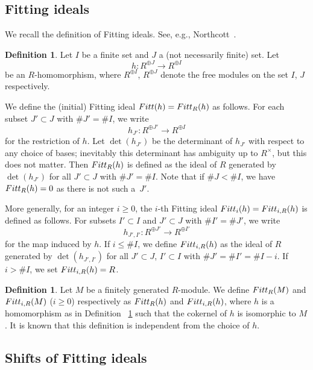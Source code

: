 \documentclass[11pt]{article}
\theoremstyle{definition}
\newtheorem{defi}[theo]{Definition}
\numberwithin{equation}{section}
\newcommand{\Fitt}{{\rm Fitt}}
\begin{document}
\subsection{Fitting ideals}\label{ss:Fitt_defn}

We recall the definition of Fitting ideals.
See, e.g., Northcott~\cite[\S 3.1]{Nor76}.

\begin{defi}\label{defn:Fitt1}
Let $I$ be a finite set and $J$ a (not necessarily finite) set.
Let
\[
h: R^{\oplus J} \to R^{\oplus I}
\]
be an $R$-homomorphism, where $R^{\oplus I}$, $R^{\oplus J}$ denote the free modules on the set $I$, $J$ respectively.

We define the (initial) Fitting ideal $\Fitt(h) = \Fitt_R(h)$ as follows.
For each subset $J' \subset J$ with $\# J' = \# I$, we write 
\[
h_{J'}: R^{\oplus J'} \to R^{\oplus I}
\]
for the restriction of $h$.
Let $\det(h_{J'})$ be the determinant of $h_{J'}$ with respect to any choice of bases; inevitably this determinant has ambiguity up to $R^{\times}$, but this does not matter.
Then $\Fitt_R(h)$ is defined as the ideal of $R$ generated by $\det(h_{J'})$ for all $J' \subset J$ with $\# J' = \# I$.
Note that if $\# J < \# I$, we have $\Fitt_R(h) = 0$ as there is not such a~$J'$.

More generally, for an integer $i \geq 0$, the $i$-th Fitting ideal $\Fitt_i(h) = \Fitt_{i, R}(h)$ is defined as follows.
For subsets $I' \subset I$ and $J' \subset J$ with $\# I' = \# J'$, we write 
\[
h_{J', I'}: R^{\oplus J'} \to R^{\oplus I'}
\]
for the map induced by $h$.
If $i \leq \# I$, we define $\Fitt_{i, R}(h)$ as the ideal of $R$ generated by $\det(h_{J', I'})$ for all $J' \subset J$, $I' \subset I$ with $\# J' = \# I' = \# I - i$.
If $i > \# I$, we set $\Fitt_{i, R}(h) = R$.
\end{defi}

\begin{defi}\label{defn:Fitt2}
Let $M$ be a finitely generated $R$-module.
We define $\Fitt_R(M)$ and $\Fitt_{i, R}(M)$ ($i \geq 0$) respectively as $\Fitt_R(h)$ and $\Fitt_{i, R}(h)$, where $h$ is a homomorphism as in Definition ~\ref{defn:Fitt1} such that the cokernel of $h$ is isomorphic to $M$.
It is known that this definition is independent from the choice of $h$.
\end{defi}

\subsection{Shifts of Fitting ideals}\label{ss:shift_defn}
\end{document}
